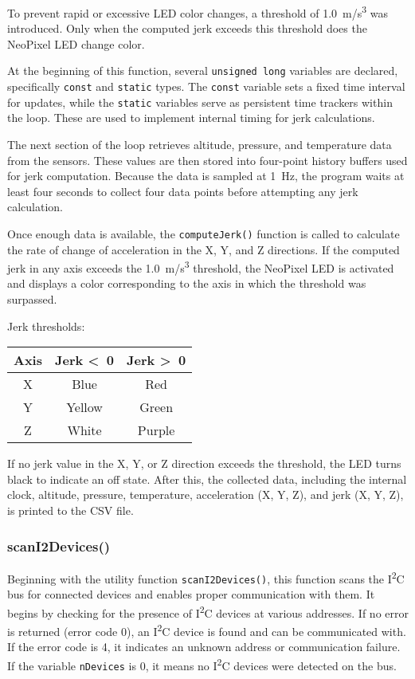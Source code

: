 \documentclass[12pt]{report}
\begin{document}
To prevent rapid or excessive LED color changes, a threshold of 1.0~m/s\textsuperscript{3} was introduced. Only when the computed jerk exceeds this threshold does the NeoPixel LED change color. \newline

At the beginning of this function, several \texttt{unsigned long} variables are declared, specifically \texttt{const} and \texttt{static} types. The \texttt{const} variable sets a fixed time interval for updates, while the \texttt{static} variables serve as persistent time trackers within the loop. These are used to implement internal timing for jerk calculations. \newline

The next section of the loop retrieves altitude, pressure, and temperature data from the sensors. These values are then stored into four-point history buffers used for jerk computation. Because the data is sampled at 1~Hz, the program waits at least four seconds to collect four data points before attempting any jerk calculation. \newline

Once enough data is available, the \texttt{computeJerk()} function is called to calculate the rate of change of acceleration in the X, Y, and Z directions. If the computed jerk in any axis exceeds the 1.0~m/s\textsuperscript{3} threshold, the NeoPixel LED is activated and displays a color corresponding to the axis in which the threshold was surpassed. \newline

Jerk thresholds:
\begin{center}
\begin{tabular}{|c|c|c|}
\hline
\textbf{Axis} & \textbf{Jerk \textless\ 0} & \textbf{Jerk \textgreater\ 0} \\
\hline
X & Blue & Red \\
Y & Yellow & Green \\
Z & White & Purple \\
\hline
\end{tabular}
\end{center}

If no jerk value in the X, Y, or Z direction exceeds the threshold, the LED turns black to indicate an off state. After this, the collected data, including the internal clock, altitude, pressure, temperature, acceleration (X, Y, Z), and jerk (X, Y, Z), is printed to the CSV file.

\subsubsection*{scanI2Devices()}
Beginning with the utility function \texttt{scanI2Devices()}, this function scans the I\textsuperscript{2}C bus for connected devices and enables proper communication with them. It begins by checking for the presence of I\textsuperscript{2}C devices at various addresses. If no error is returned (error code 0), an I\textsuperscript{2}C device is found and can be communicated with. If the error code is 4, it indicates an unknown address or communication failure. If the variable \texttt{nDevices} is 0, it means no I\textsuperscript{2}C devices were detected on the bus.
\end{document}
